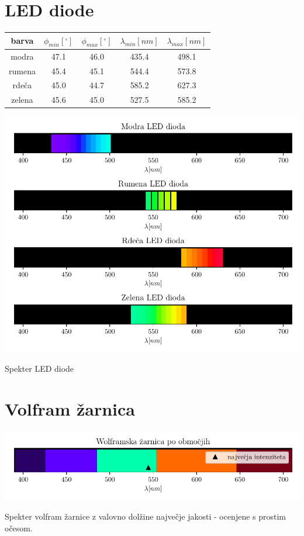 \documentclass[12pt]{report}
\begin{document}
\section*{LED diode}

\begin{tabela}[H]
  \centering
  \begin{tabular}{|c|c|c|c|c|}\hline
    barva & $\phi_{min} [^{\circ}]$ & $\phi_{max} [^{\circ}]$ & $\lambda_{min} [nm]$ & $\lambda_{max} [nm] $\\ \hline
    modra & 47.1 &    46.0 &   435.4 &   498.1\\
    rumena & 45.4 &    45.1 &   544.4 &   573.8\\
    rdeča & 45.0 &    44.7 &   585.2 &   627.3\\
    zelena & 45.6 &    45.0 &   527.5 &   585.2\\ \hline 
  \end{tabular}
\end{tabela}

\begin{slika}[H]
  \centering
  \includegraphics{led}
  \caption{\small Spekter LED diode}
\end{slika}

\section*{Volfram žarnica}

\begin{slika}[H]
  \centering
  \includegraphics{wolfram}
  \caption{\small Spekter volfram žarnice z valovno dolžine največje jakosti - ocenjene s prostim očesom.}
\end{slika}
\end{document}
